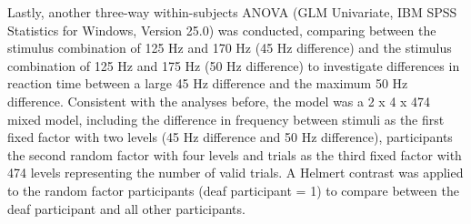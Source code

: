 \documentclass[12pt]{article}
\begin{document}
%
\par Lastly, another three-way within-subjects ANOVA (GLM Univariate, IBM SPSS Statistics for Windows, Version 25.0) was conducted, comparing between the stimulus combination of 125 Hz and 170 Hz (45 Hz difference) and the stimulus combination of 125 Hz and 175 Hz (50 Hz difference) to investigate differences in reaction time between a large 45 Hz difference and the maximum 50 Hz difference. Consistent with the analyses  before, the model was a 2 x 4 x 474 mixed model, including the difference in frequency between stimuli as the first fixed factor with two levels (45 Hz difference and 50 Hz difference), participants the second random factor with four levels and trials as the third fixed factor with 474 levels representing the number of valid trials. A Helmert contrast was applied to the random factor participants (deaf participant = 1) to compare between the deaf participant and all other participants.
\end{document}
